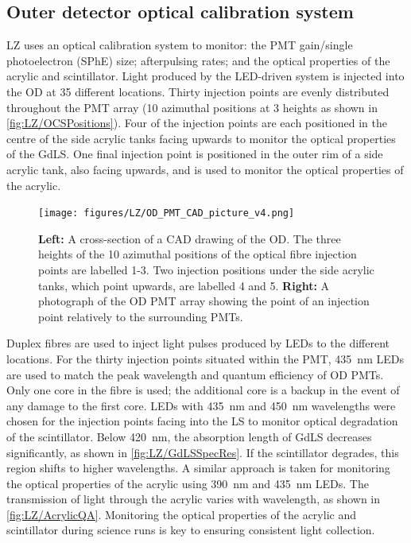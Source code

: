 \subsection{Outer detector optical calibration system}\label{sec:LZ/ODOCS}
LZ uses an optical calibration system to monitor: the PMT gain/single photoelectron (SPhE) size; afterpulsing rates; and the optical properties of the acrylic and scintillator. Light produced by the LED-driven system is injected into the OD at 35 different locations. Thirty injection points are evenly distributed throughout the PMT array  (10 azimuthal positions at 3 heights as shown in \autoref{fig:LZ/OCSPositions}). Four of the injection points are each positioned in the centre of the side acrylic tanks facing upwards to monitor the optical properties of the GdLS. One final injection point is positioned in the outer rim of a side acrylic tank, also facing upwards, and is used to monitor the optical properties of the acrylic.
\begin{figure}[!ht]
    \centering
    \texttt{[image: figures/LZ/OD\_PMT\_CAD\_picture\_v4.png]}
    \caption[A cross-section of a CAD drawing of the OD alongside a photograph of the OD PMT array.]{\textbf{Left:} A cross-section of a CAD drawing of the OD. The three heights of the 10 azimuthal positions of the optical fibre injection points are labelled 1-3. Two injection positions under the side acrylic tanks, which point upwards, are labelled 4 and 5. \textbf{Right:} A photograph of the OD PMT array showing the point of an injection point relatively to the surrounding PMTs.}
    \label{fig:LZ/OCSPositions}
\end{figure}
Duplex fibres are used to inject light pulses produced by LEDs to the different locations. For the thirty injection points situated within the PMT, 435~nm LEDs are used to match the peak wavelength and quantum efficiency of OD PMTs. Only one core in the fibre is used; the additional core is a backup in the event of any damage to the first core. LEDs with 435~nm and 450~nm wavelengths were chosen for the injection points facing into the LS to monitor optical degradation of the scintillator. Below 420~nm, the absorption length of GdLS decreases significantly, as shown in \autoref{fig:LZ/GdLSSpecRes}. If the scintillator degrades, this region shifts to higher wavelengths. A similar approach is taken for monitoring the optical properties of the acrylic using 390~nm and 435~nm LEDs. The transmission of light through the acrylic varies with wavelength, as shown in \autoref{fig:LZ/AcrylicQA}. Monitoring the optical properties of the acrylic and scintillator during science runs is key to ensuring consistent light collection.

